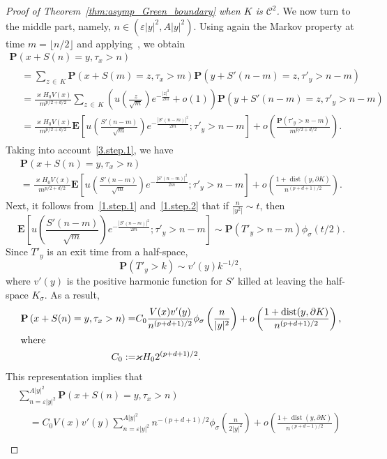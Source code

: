 \documentclass[AHL,Unicode,longabstracts,published]{cedram}
\DeclareMathOperator{\dist}{dist}
\newcommand{\clC}{\mathcal{C}}
\newcommand{\pr}{\mathbf{P}}
\newcommand{\e}{\mathbf{E}}
\begin{document}
\begin{proof}[Proof of Theorem~\ref{thm:asymp_Green_boundary} when $K$ is $\clC^{2}$]
We now turn to the middle part, namely, $n\in(\varepsilon|y|^2,A| y|^2)$. Using again the Markov property at time $m=\lfloor n/2\rfloor$ and applying~\cite[Theorem~5]{DeWa-15}, we obtain
\begin{multline*}
\pr\left(x+S(n)=y,\tau_x>n\right)\\
\begin{aligned}
&=\sum_{z\,\in\,K}\pr\left(x+S(m)=z,\tau_x>m\right)\pr\left(y+S'(n-m)=z,\tau'_y>n-m\right)\\
&=\frac{\varkappa H_0V(x)}{m^{p/2+d/2}}
\sum_{z\,\in\,K}\left(u\left(\frac{z}{\sqrt{m}}\right)e^{-\frac{|z|^2}{2m}}+o(1)\right)\pr\left(y+S'(n-m)=z,\tau'_y>n-m\right)\\
&=\frac{\varkappa H_0V(x)}{m^{p/2+d/2}}
\e\left[u\left(\frac{S'(n-m)}{\sqrt{m}}\right)e^{-\frac{\left|S'(n-m)\right|^2}{2m}};\tau'_y>n-m\right] +o\left(\frac{\pr\left(\tau'_y>n-m\right)}{m^{p/2+d/2}}\right).
\end{aligned}
\end{multline*}
Taking into account~\eqref{3.step.1}, we have
\begin{multline*}
\pr\left(x+S(n)=y,\tau_x>n\right)\\
=\frac{\varkappa H_0V(x)}{m^{p/2+d/2}}
\e\left[u\left(\frac{S'(n-m)}{\sqrt{m}}\right)e^{-\frac{\left|S'(n-m)\right|^2}{2m}};\tau'_y>n-m\right] +o\left(\frac{1+\dist(y,\partial K)}{n^{(p+d+1)/2}}\right).
\end{multline*}
Next, it follows from~\eqref{1.step.1} and~\eqref{1.step.2} that if $\frac{n}{| y^2|}\sim t$, then
\[
\e\left[u\left(\frac{S'(n-m)}{\sqrt{m}}\right)e^{-\frac{\left|S'(n-m)\right|^2}{2m}};\tau'_y>n-m\right]
\sim \pr\left(T'_y>n-m\right) \phi_\sigma(t/2).
\]
Since $T'_y$ is an exit time from a half-space,
\[
\pr\left(T'_y>k\right)\sim v'(y)k^{-1/2},
\]
where $v'(y)$ is the positive harmonic function for $S'$ killed at leaving the half-space $K_{\sigma}$. As a result,
\begin{align*}
\pr\left(x+S(n)=y,\tau_x>n\right) =& C_0 \frac{V(x)v'(y)}{n^{(p+d+1)/2}}\phi_\sigma\left(\frac{n}{|y|^2}\right) +o\left(\frac{1+\dist(y, \partial K)}{n^{(p+d+1)/2}}\right),
\\
\intertext{where}
C_0:=& \varkappa H_0 2^{(p+d+1)/2}.
\end{align*}
This representation implies that
\begin{multline*}
\sum_{n=\varepsilon|y|^2}^{A| y|^2}\pr(x+S(n)=y,\tau_x>n)\\
\begin{aligned}
&= C_0V(x)v'(y)\sum_{n=\varepsilon|y|^2}^{A|y|^2}n^{-(p+d+1)/2}\phi_\sigma\left(\frac{n}{2|y|^2}\right) +o\left(\frac{1+\dist(y, \partial K)}{n^{(p+d-1)/2}}\right)\\

\end{aligned}
\end{multline*}
\end{proof}
\end{document}
